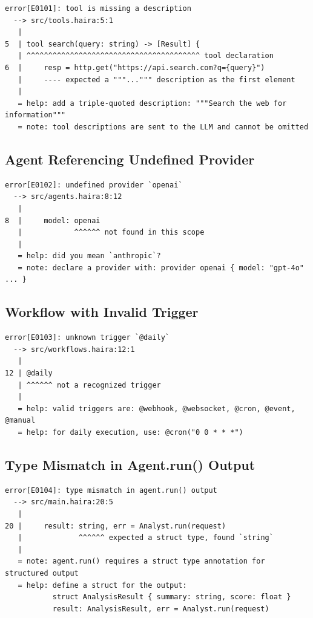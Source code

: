 \begin{lstlisting}[language={},numbers=none]
error[E0101]: tool is missing a description
  --> src/tools.haira:5:1
   |
5  | tool search(query: string) -> [Result] {
   | ^^^^^^^^^^^^^^^^^^^^^^^^^^^^^^^^^^^^^^^^ tool declaration
6  |     resp = http.get("https://api.search.com?q={query}")
   |     ---- expected a """...""" description as the first element
   |
   = help: add a triple-quoted description: """Search the web for information"""
   = note: tool descriptions are sent to the LLM and cannot be omitted
\end{lstlisting}

\subsection{Agent Referencing Undefined Provider}

\begin{lstlisting}[language={},numbers=none]
error[E0102]: undefined provider `openai`
  --> src/agents.haira:8:12
   |
8  |     model: openai
   |            ^^^^^^ not found in this scope
   |
   = help: did you mean `anthropic`?
   = note: declare a provider with: provider openai { model: "gpt-4o" ... }
\end{lstlisting}

\subsection{Workflow with Invalid Trigger}

\begin{lstlisting}[language={},numbers=none]
error[E0103]: unknown trigger `@daily`
  --> src/workflows.haira:12:1
   |
12 | @daily
   | ^^^^^^ not a recognized trigger
   |
   = help: valid triggers are: @webhook, @websocket, @cron, @event, @manual
   = help: for daily execution, use: @cron("0 0 * * *")
\end{lstlisting}

\subsection{Type Mismatch in Agent.run() Output}

\begin{lstlisting}[language={},numbers=none]
error[E0104]: type mismatch in agent.run() output
  --> src/main.haira:20:5
   |
20 |     result: string, err = Analyst.run(request)
   |             ^^^^^^ expected a struct type, found `string`
   |
   = note: agent.run() requires a struct type annotation for structured output
   = help: define a struct for the output:
           struct AnalysisResult { summary: string, score: float }
           result: AnalysisResult, err = Analyst.run(request)
\end{lstlisting}

